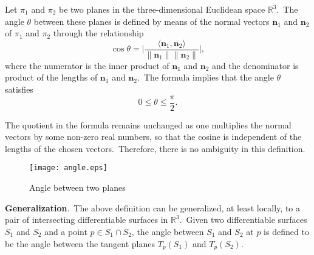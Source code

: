 \documentclass[12pt]{article}
\begin{document}
Let $\pi_1$ and $\pi_2$ be two planes in the three-dimensional Euclidean space $\mathbb{R}^3$.\, The angle $\theta$ between these planes is defined by means of the normal vectors $\boldsymbol{n}_1$ and $\boldsymbol{n}_2$ of $\pi_1$ and $\pi_2$ through the relationship
$$\cos\theta = \Big| \frac{\langle \boldsymbol{n}_1,\boldsymbol{n}_2\rangle }{\| \boldsymbol{n}_1 \| \| \boldsymbol{n}_2 \|}\Big|,$$
where the numerator is the inner product of $\boldsymbol{n}_1$ and $\boldsymbol{n}_2$ and the denominator is product of the lengths of $\boldsymbol{n}_1$ and $\boldsymbol{n}_2$.\, The formula implies that the angle $\theta$ satisfies
$$0 \le \theta \le \frac{\pi}{2}.$$

The quotient in the formula remains unchanged as one multiplies the normal vectors by some non-zero real numbers, so that the cosine is independent of the lengths of the chosen vectors.\, Therefore, there is no ambiguity in this definition.

\begin{figure}
\begin{center}
\texttt{[image: angle.eps]}
\caption{Angle between two planes}
\end{center}
\end{figure}

\textbf{Generalization}.\, The above definition can be generalized, at least locally, to a pair of intersecting differentiable surfaces in $\mathbb{R}^3$.\, Given two differentiable surfaces $S_1$ and $S_2$ and a point $p\in S_1\cap S_2$, the angle between $S_1$ and $S_2$ at $p$ is defined to be the angle between the tangent planes $T_p(S_1)$ and $T_p(S_2)$.

\end{document}
